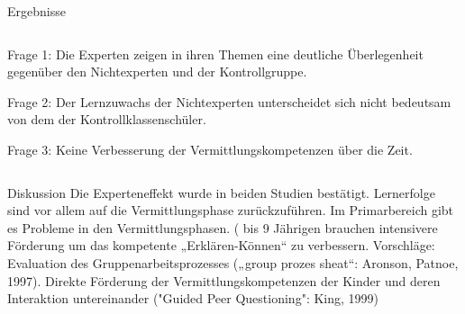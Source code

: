 \begin{block}{Ergebnisse}
\begin{columns}[t,totalwidth=\twocolwid]
\begin{column}{\onecolwid}
\justifying
Frage 1: Die Experten zeigen in ihren Themen eine deutliche Überlegenheit gegenüber den Nichtexperten und der Kontrollgruppe.

Frage 2: Der Lernzuwachs der Nichtexperten unterscheidet sich nicht bedeutsam von dem der Kontrollklassenschüler.

Frage 3: Keine Verbesserung der Vermittlungskompetenzen über die Zeit.
\end{column}

\end{columns}
\end{block}

\begin{block}{Diskussion}
Die Experteneffekt wurde in beiden Studien bestätigt. Lernerfolge sind vor allem auf die Vermittlungsphase zurückzuführen. Im Primarbereich gibt es Probleme in den Vermittlungsphasen. ( bis 9 Jährigen brauchen intensivere Förderung um das kompetente „Erklären-Können“ zu verbessern. Vorschläge: Evaluation des Gruppenarbeitsprozesses („group prozes sheat“: Aronson, Patnoe, 1997). Direkte Förderung der Vermittlungskompetenzen der Kinder und deren Interaktion untereinander ("Guided Peer Questioning": King, 1999)
\end{block}

